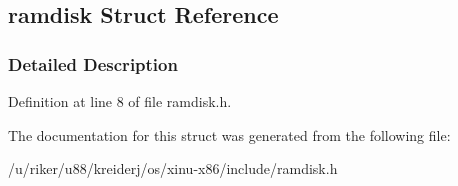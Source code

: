 \hypertarget{structramdisk}{}\subsection{ramdisk Struct Reference}
\label{structramdisk}


\subsubsection{Detailed Description}


Definition at line 8 of file ramdisk.\+h.



The documentation for this struct was generated from the following file\+:\begin{DoxyCompactItemize}
\item 
/u/riker/u88/kreiderj/os/xinu-\/x86/include/ramdisk.\+h\end{DoxyCompactItemize}
